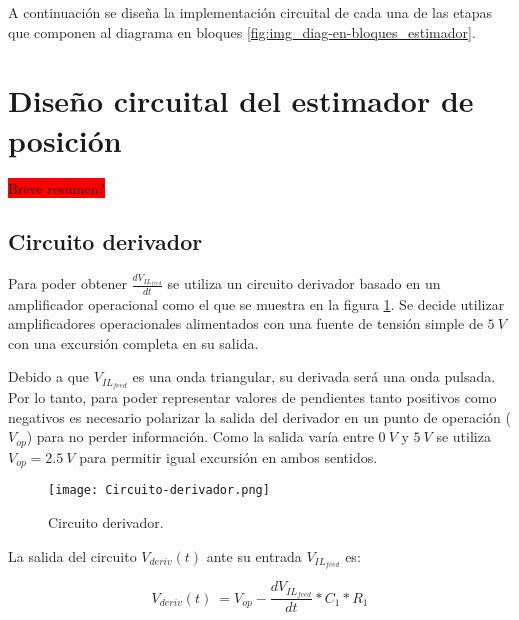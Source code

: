 A continuación se diseña la implementación circuital de cada una de las etapas que componen al diagrama en bloques \ref{fig:img_diag-en-bloques_estimador}.

{
	
}


\section{Diseño circuital del estimador de posición}
\colorbox{red}{Breve resumen?}

\subsection{Circuito derivador}

Para poder obtener $\frac{dV_{IL_{feed}}}{dt}$ se utiliza un circuito derivador basado en un amplificador operacional como el que se muestra en la figura \ref{fig:img_Circuito-derivador}. Se decide utilizar amplificadores operacionales alimentados con una fuente de tensión simple de $5\:V$ con una excursión completa en su salida. 

Debido a que $V_{IL_{feed}}$ es una onda triangular, su derivada será una onda pulsada. Por lo tanto, para poder representar valores de pendientes tanto positivos como negativos es necesario polarizar la salida del derivador en un punto de operación ($V_{op}$) para no perder información. Como la salida varía entre $0\:V$ y $5\:V$ se utiliza $V_{op}=2.5\:V$ para permitir igual excursión en ambos sentidos.

\begin{figure}[H]
	\centering
	\texttt{[image: Circuito-derivador.png]}
	\caption{Circuito derivador.}
	\label{fig:img_Circuito-derivador}
\end{figure}


La salida del circuito $V_{deriv}(t)$ ante su entrada $V_{IL_{feed}}$ es:

\begin{equation} 
	V_{deriv}(t)\ = V_{op} - \frac{dV_{IL_{feed}}}{dt}*C_1*R_1
\end{equation}

